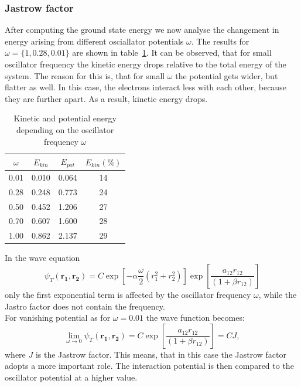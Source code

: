 \subsubsection{Jastrow factor}\label{sec:Jastro}
After computing the ground state energy we now analyse the changement in energy arising from different osciallator potentials $\omega$. The results for $\omega =\{1,0.28,0.01\}$ are shown in table~\ref{tab:omega}. It can be observed, that for small oscillator frequency the kinetic energy drops relative to the total energy of the system. The reason for this is, that for small $\omega$ the potential gets wider, but flatter as well. In this case, the electrons interact less with each other, because they are further apart. As a result, kinetic energy drops.\\
\begin{table}[H]
\centering
\caption{Kinetic and potential energy depending on the oscillator frequency $\omega$}
    \begin{tabular}{c|cc|c}
   \toprule
    $\omega$ & $E_{kin}$  & $E_{pot}$  & $E_{kin} (\%)$ \\ 
    \midrule
    0.01   & 0.010 & 0.064 & 14          \\
    0.28   & 0.248  & 0.773  & 24       \\
    0.50    & 0.452  & 1.206   & 27         \\
    0.70    & 0.607  & 1.600   & 28           \\
    1.00      & 0.862  & 2.137   & 29          \\
    \bottomrule
    \end{tabular}
\label{tab:omega}
\end{table}
In the wave equation
\begin{equation}
\psi_T(\mathbf{r_1,r_2}) = C \exp\left[-\alpha\frac{\omega}{2} (r_1^2+r_2^2)\right] \exp \left[ \frac{a_{12} r_{12}}{(1+\beta r_{12})} \right]
\end{equation}
only the first exponential term is affected by the oscillator frequency $\omega$, while the Jastro factor does not contain the frequency.\\
For vanishing potential as for $\omega =0.01$ the wave function becomes:
\begin{equation}
\lim_{\omega\rightarrow 0} \psi_T(\mathbf{r_1,r_2}) = C \exp \left[ \frac{a_{12} r_{12}}{(1+\beta r_{12})} \right] = C J,
\end{equation}
where $J$ is the Jastrow factor. This means, that in this case the Jastrow factor adopts a more important role. The interaction potential is then compared to the oscillator potential at a higher value.
